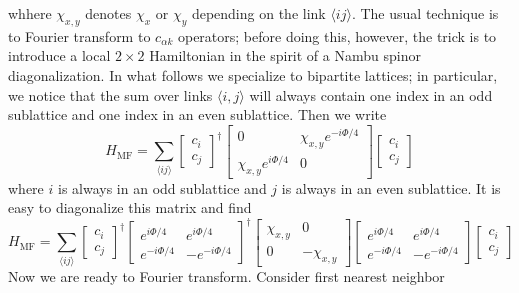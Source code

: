 \documentclass{report}
\begin{document}
whhere $ \chi_{x,y} $ denotes $ \chi_x $ or $ \chi_y $ depending on the link 
$ \langle i j\rangle $. The usual technique is to Fourier transform to 
$ c_{\alpha k} $ operators; before doing this, however, the trick is to 
introduce a local $ 2\times 2 $ Hamiltonian in the spirit of a Nambu spinor 
diagonalization. In what follows we specialize to bipartite lattices; in
particular, we notice that the sum over links $ \langle i, j\rangle $ will
always contain one index in an odd sublattice and one index in an even
sublattice. Then we write 
\begin{equation*}
	H_{\text{MF}}
		= \sum_{\langle ij \rangle}
			\begin{bmatrix}
			c_i \\ c_j
			\end{bmatrix}^\dagger 
			\begin{bmatrix}
			0 & \chi_{x,y} e^{-i\Phi/4}\\
			\chi_{x,y} e^{i\Phi/4} & 0 
			\end{bmatrix} 
			\begin{bmatrix}
			c_i \\ c_j
			\end{bmatrix}
\end{equation*}
where $ i $ is always in an odd sublattice and $ j $ is always in an 
even sublattice. It is easy to diagonalize this matrix and find 
\begin{equation}\label{eq:heisenberg-qed3-hmft}
	H_{\text{MF}}
		= \sum_{\langle ij \rangle}
			\begin{bmatrix}
			c_i \\ c_j
			\end{bmatrix}^\dagger 
			\begin{bmatrix}
			e^{i\Phi/4} & e^{i\Phi/4}\\ 
			e^{-i\Phi/4} & -e^{-i\Phi/4}
			\end{bmatrix}^\dagger
			\begin{bmatrix}
			\chi_{x,y} & 0 \\ 0 & -\chi_{x,y}
			\end{bmatrix}
			\begin{bmatrix}
			e^{i\Phi/4} & e^{i\Phi/4}\\ 
			e^{-i\Phi/4} & -e^{-i\Phi/4}
			\end{bmatrix}
			\begin{bmatrix}
			c_i \\ c_j
			\end{bmatrix}
\end{equation}
Now we are ready to Fourier transform. Consider first nearest neighbor
\end{document}
